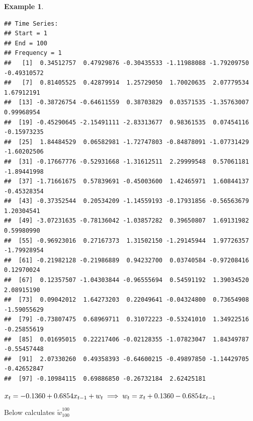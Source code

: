 \documentclass[
]{book}
\newenvironment{Shaded}{\begin{snugshade}}{\end{snugshade}}
\newcommand{\CommentTok}[1]{\textcolor[rgb]{0.56,0.35,0.01}{\textit{#1}}}
\newcommand{\DecValTok}[1]{\textcolor[rgb]{0.00,0.00,0.81}{#1}}
\newcommand{\FunctionTok}[1]{\textcolor[rgb]{0.00,0.00,0.00}{#1}}
\newcommand{\NormalTok}[1]{#1}
\newcommand{\SpecialCharTok}[1]{\textcolor[rgb]{0.00,0.00,0.00}{#1}}
\theoremstyle{definition}
\theoremstyle{definition}
\newtheorem{example}{Example}[chapter]
\theoremstyle{definition}
\theoremstyle{definition}
\theoremstyle{remark}
\begin{document}
\begin{example}
\begin{verbatim}
## Time Series:
## Start = 1 
## End = 100 
## Frequency = 1 
##   [1]  0.34512757  0.47929876 -0.30435533 -1.11988088 -1.79209750 -0.49310572
##   [7]  0.81405525  0.42879914  1.25729050  1.70020635  2.07779534  1.67912191
##  [13] -0.38726754 -0.64611559  0.38703829  0.03571535 -1.35763007  0.99968954
##  [19] -0.45290645 -2.15491111 -2.83313677  0.98361535  0.07454116 -0.15973235
##  [25]  1.84484529  0.06582981 -1.72747803 -0.84878091 -1.07731429 -1.60202506
##  [31] -0.17667776 -0.52931668 -1.31612511  2.29999548  0.57061181 -1.89441998
##  [37] -1.71661675  0.57839691 -0.45003600  1.42465971  1.60844137 -0.45328354
##  [43] -0.37352544  0.20534209 -1.14559193 -0.17931856 -0.56563679  1.20304541
##  [49] -3.07231635 -0.78136042 -1.03857282  0.39650807  1.69131982  0.59980990
##  [55] -0.96923016  0.27167373  1.31502150 -1.29145944  1.97726357 -1.79928954
##  [61] -0.21982128 -0.21986889  0.94232700  0.03740584 -0.97208416  0.12970024
##  [67]  0.12357507 -1.04303844 -0.96555694  0.54591192  1.39034520  2.08915190
##  [73]  0.09042012  1.64273203  0.22049641 -0.04324800  0.73654908 -1.59055629
##  [79] -0.73807475  0.68969711  0.31072223 -0.53241010  1.34922516 -0.25855619
##  [85]  0.01695015  0.22217406 -0.02128355 -1.07823047  1.84349787 -0.55457448
##  [91]  2.07330260  0.49358393 -0.64600215 -0.49897850 -1.14429705 -0.42652847
##  [97] -0.10984115  0.69886850 -0.26732184  2.62425181
\end{verbatim}

\(x_t=-0.1360+0.6854x_{t-1}+w_t\\ \implies w_t=x_t+0.1360-0.6854x_{t-1}\)

Below calculates \(\tilde w^{100}_{100}\)

\begin{Shaded}
\end{Shaded}


\end{example}
\end{document}
